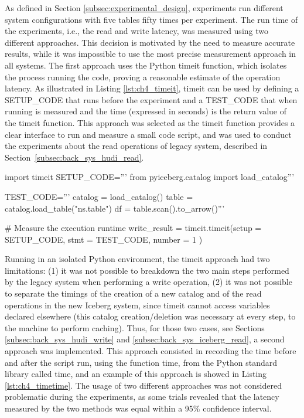 As defined in Section \ref{subsec:experimental_design}, experiments run different system configurations with five tables fifty times per experiment.
The run time of the experiments, i.e., the read and write latency, was measured using two different approaches. This decision is motivated by the need to measure accurate results, while it was impossible to use the most precise measurement approach in all systems. The first approach uses the Python timeit function, which isolates the process running the code, proving a reasonable estimate of the operation latency. As illustrated in Listing \ref{lst:ch4_timeit}, timeit can be used by defining a SETUP\_CODE that runs before the experiment and a TEST\_CODE that when running is measured and the time (expressed in seconds) is the return value of the timeit function. This approach was selected as the timeit function provides a clear interface to run and measure a small code script, and was used to conduct the experiments about the read operations of legacy system, described in Section~\ref{subsec:back_sys_hudi_read}.

\begin{minipage}{\textwidth}
    \begin{python}[caption={[Measuring latency using Timeit] Timeit usage to measure the time to read from Iceberg table stored on \gls{HopsFS}.}, label={lst:ch4_timeit}, basicstyle=\small]
    import timeit
    SETUP_CODE='''
    from pyiceberg.catalog import load_catalog'''
        
    TEST_CODE='''
    catalog = load_catalog()
    table   = catalog.load_table("ns.table")
    df      = table.scan().to_arrow()'''
    
    # Measure the execution runtime
    write_result = timeit.timeit(setup  = SETUP_CODE,
                                 stmt   = TEST_CODE,
                                 number = 1          )
    \end{python}
\end{minipage}
\medskip

Running in an isolated Python environment, the timeit approach had two limitations: (1) it was not possible to breakdown the two main steps performed by the legacy system when performing a write operation, (2) it was not possible to separate the timings of the creation of a new catalog and of the read operations in the new Iceberg system, since timeit cannot access variables declared elsewhere (this catalog creation/deletion was necessary at every step, to the machine to perform caching). Thus, for those two cases, see Sections \ref{subsec:back_sys_hudi_write} and \ref{subsec:back_sys_iceberg_read}, a second approach was implemented. This approach consisted in recording the time before and after the script run, using the function time, from the Python standard library called time, and an example of this approach is showed in Listing \ref{lst:ch4_timetime}. The usage of two different approaches was not considered problematic during the experiments, as some trials revealed that the latency measured by the two methods was equal within a 95\% confidence interval.

